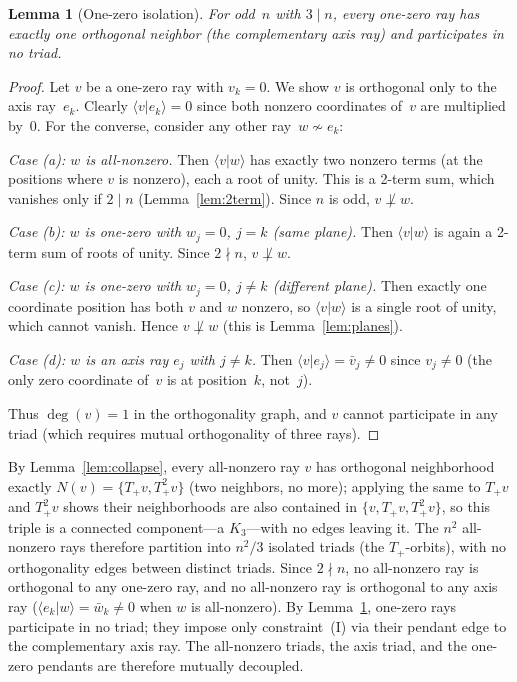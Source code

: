 \documentclass[twocolumn,prl,superscriptaddress,nofootinbib]{revtex4-2}
\newtheorem{lemma}{Lemma}
\begin{document}
\begin{lemma}[One-zero isolation]\label{lem:onezero}
For odd~$n$ with $3 \mid n$, every one-zero ray has exactly one orthogonal neighbor (the complementary axis ray) and participates in no triad.
\end{lemma}

\begin{proof}
Let $v$ be a one-zero ray with $v_k = 0$.  We show $v$ is orthogonal only to the axis ray~$e_k$.  Clearly $\langle v | e_k \rangle = 0$ since both nonzero coordinates of~$v$ are multiplied by~0.  For the converse, consider any other ray~$w \not\sim e_k$:

\emph{Case (a): $w$ is all-nonzero.}  Then $\langle v | w \rangle$ has exactly two nonzero terms (at the positions where $v$ is nonzero), each a root of unity.  This is a 2-term sum, which vanishes only if $2 \mid n$ (Lemma~\ref{lem:2term}).  Since $n$ is odd, $v \not\perp w$.

\emph{Case (b): $w$ is one-zero with $w_j = 0$, $j = k$ (same plane).}  Then $\langle v | w \rangle$ is again a 2-term sum of roots of unity.  Since $2 \nmid n$, $v \not\perp w$.

\emph{Case (c): $w$ is one-zero with $w_j = 0$, $j \neq k$ (different plane).}  Then exactly one coordinate position has both $v$ and $w$ nonzero, so $\langle v | w \rangle$ is a single root of unity, which cannot vanish.  Hence $v \not\perp w$ (this is Lemma~\ref{lem:planes}).

\emph{Case (d): $w$ is an axis ray $e_j$ with $j \neq k$.}  Then $\langle v | e_j \rangle = \bar{v}_j \neq 0$ since $v_j \neq 0$ (the only zero coordinate of~$v$ is at position~$k$, not~$j$).

Thus $\deg(v) = 1$ in the orthogonality graph, and $v$ cannot participate in any triad (which requires mutual orthogonality of three rays).
\end{proof}

By Lemma~\ref{lem:collapse}, every all-nonzero ray $v$ has orthogonal neighborhood exactly $N(v) = \{T_+v, T_+^2 v\}$ (two neighbors, no more); applying the same to $T_+v$ and $T_+^2v$ shows their neighborhoods are also contained in $\{v, T_+v, T_+^2v\}$, so this triple is a connected component---a $K_3$---with no edges leaving it.  The $n^2$ all-nonzero rays therefore partition into $n^2/3$ isolated triads (the $T_+$-orbits), with no orthogonality edges between distinct triads.  Since $2 \nmid n$, no all-nonzero ray is orthogonal to any one-zero ray, and no all-nonzero ray is orthogonal to any axis ray ($\langle e_k | w \rangle = \bar w_k \neq 0$ when $w$ is all-nonzero).  By Lemma~\ref{lem:onezero}, one-zero rays participate in no triad; they impose only constraint~(I) via their pendant edge to the complementary axis ray.  The all-nonzero triads, the axis triad, and the one-zero pendants are therefore mutually decoupled.
\end{document}
